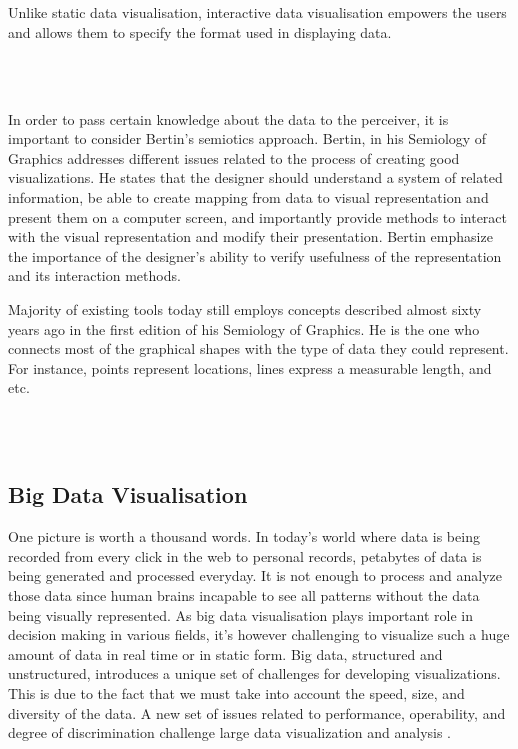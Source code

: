 \\\

 Unlike static data visualisation, interactive data visualisation empowers the users and allows them to specify the format used in displaying data. 
 
 \\\
 
 
 In order to pass certain knowledge about the data to the perceiver, it is important to consider Bertin's semiotics approach. Bertin, in his Semiology of Graphics \cite{bertin1983semiology} addresses different issues related to the process of creating good visualizations. He states that the designer should understand a system of related information, be able to create mapping from data to visual representation and present them on a computer screen, and importantly provide methods to interact with the visual representation and modify their presentation. Bertin emphasize the importance of the designer's ability to verify usefulness of the representation and its interaction methods. 
 
 
 Majority of existing tools today still employs concepts described almost sixty years ago in the first edition of his Semiology of Graphics. He is the one who connects most of the graphical shapes with the type of data they could represent. For instance, points represent locations, lines express a measurable length, and etc. 
 
 \\\
 
\subsection{Big Data Visualisation}

One picture is worth a thousand words. In today's world where data is being recorded from every click in the web to personal records, petabytes of data is being generated and processed everyday. It is not enough to process and analyze those data since human brains incapable to see all patterns without the data being visually represented. As big data visualisation plays important role in decision making in various fields, it's however challenging to visualize such a huge amount of data in real time or in static form.  Big data, structured and unstructured, introduces a unique set of challenges for developing visualizations. This is due to the fact that we must take into account the speed, size, and diversity of the data. A new set of issues related to performance, operability, and degree of discrimination challenge large data visualization and analysis \cite{li2015advanced}.  

